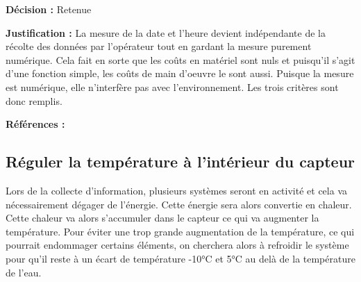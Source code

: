 \textbf{Décision :} Retenue

\textbf{Justification :} La mesure de la date et l'heure devient indépendante de la récolte des données par l'opérateur tout en gardant la mesure purement numérique. Cela fait en sorte que les coûts en matériel sont nuls et puisqu'il s'agit d'une fonction simple, les coûts de main d'oeuvre le sont aussi. Puisque la mesure est numérique, elle n'interfère pas avec l'environnement. Les trois critères sont donc remplis.

\textbf{Références :} 


\begin{table}[!htb]
\footnotesize
\centering
{}
\caption{Évaluation globales des concepts pour la mesure de la date et l'heure}
\label{t:Decision_date_heure}
\end{table}



\subsection{Réguler la température à l'intérieur du capteur}

Lors de la collecte d'information, plusieurs systèmes seront en activité et cela va nécessairement dégager de l'énergie. Cette énergie sera alors convertie en chaleur. Cette chaleur va alors s'accumuler dans le capteur ce qui va augmenter la température. Pour éviter une trop grande augmentation de la température, ce qui pourrait endommager certains éléments, on cherchera alors à refroidir le système pour qu'il reste à un écart de température -10°C et 5°C au delà de la température de l'eau.

